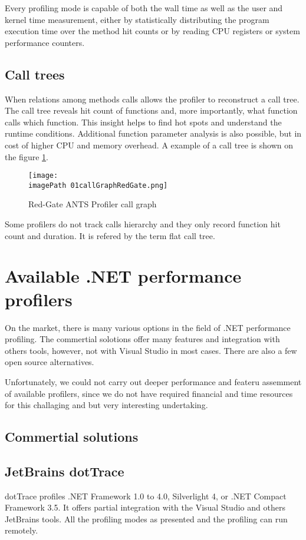 Every profiling mode is capable of both the wall time as well as the user and kernel time measurement, either by statistically distributing the program execution time over the method hit counts or by reading CPU registers or system performance counters.

\subsection{Call trees}
When relations among methods calls allows the profiler to reconstruct a call tree. The call tree reveals hit count of functions and, more importantly, what function calls which function. This insight helps to find hot spots and understand the runtime conditions.
Additional function parameter analysis is also possible, but in cost of higher CPU and memory overhead. A example of a call tree is shown on the figure \ref{fig:01callGraphRedGate}.

\begin{figure}
	\centering
		\texttt{[image: \\imagePath 01callGraphRedGate.png]}
		\caption{Red-Gate ANTS Profiler call graph}
	\label{fig:01callGraphRedGate}
\end{figure}

Some profilers do not track calls hierarchy and they only record function hit count and duration. It is refered by the term flat call tree.

\section{Available .NET performance profilers}
On the market, there is many various options in the field of .NET performance profiling. The commertial solotions offer many features and integration with others tools, however, not with Visual Studio in most cases. There are also a few open source alternatives.

Unfortunately, we could not carry out deeper performance and feateru assemment of available profilers, since we do not have required financial and time resources for this challaging and but very interesting undertaking.

\subsection*{Commertial solutions}

\subsection{JetBrains dotTrace}
dotTrace profiles .NET Framework 1.0 to 4.0, Silverlight 4, or .NET Compact Framework 3.5. It offers partial integration with the Visual Studio and others JetBrains tools. All the profiling modes as presented and the profiling can run remotely.

